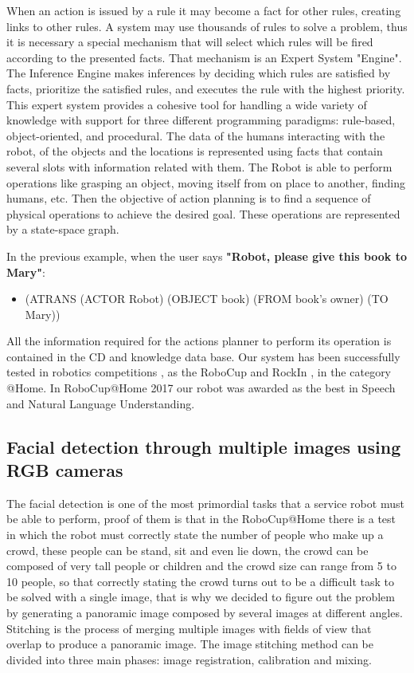 \documentclass{llncs}
\begin{document}
When an action is issued by a rule it may become a fact for other rules, creating links to other rules. A system may use thousands of rules to solve a problem, thus it is necessary a special mechanism that will select which rules will be fired according to the presented facts. That mechanism is an Expert System "Engine".
The Inference Engine makes inferences by deciding which rules are satisfied by facts, prioritize the 
satisfied rules, and executes the rule with the highest priority.
This expert system provides a cohesive tool for handling a wide variety of knowledge with support for three different programming paradigms: rule-based, object-oriented, and procedural.
The data of the humans interacting with the robot, of the objects and the locations is represented using facts that contain several slots with information related with them.
The Robot is able to perform operations like grasping an object, moving itself from on place to another, finding humans, etc. Then the objective of action planning is to find a sequence of physical operations to achieve the desired goal.
These operations are represented by a state-space graph.

In the previous example, when the user says {\bf "Robot, please give this book to Mary"}: 
\begin{itemize}
\item []
	(ATRANS (ACTOR Robot) (OBJECT book) (FROM book's owner) (TO Mary))
\end{itemize}

All the information required for the actions planner to perform its operation is contained in the CD and knowledge data base. 
Our system has been successfully tested in robotics competitions \cite{Savage}, as the RoboCup and RockIn 
\cite{Robocup_2017}, in the category @Home.
In RoboCup@Home 2017 our robot was awarded as the best in Speech and Natural Language Understanding.



\subsection{Facial detection through multiple images using RGB cameras}\label{subsec:FacialReco}
The facial detection is one of the most primordial tasks that a service robot must be able to perform, proof of them is that in the RoboCup@Home there is a test in which the robot must correctly state the number of people who make up a crowd, these people can  be stand, sit and even lie down, the crowd can be composed of very tall people or children and the crowd size can range from 5 to 10 people, so that correctly stating the crowd turns out to be a difficult task to be solved with a single image, that is why we decided to figure out the problem by generating a panoramic image composed by several images at different angles. Stitching is the process of merging multiple images with fields of view that overlap to produce a panoramic image. %
The image stitching method can be divided into three main phases: image registration, calibration and mixing.
\end{document}
